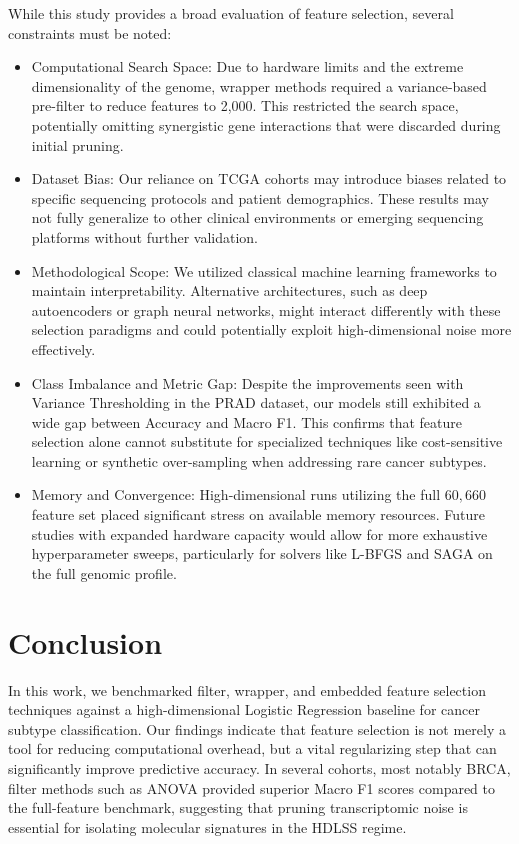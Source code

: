 \documentclass{article}
\begin{document}
While this study provides a broad evaluation of feature selection, several constraints must be noted:

\begin{itemize}
    \item Computational Search Space: Due to hardware limits and the extreme dimensionality of the genome, wrapper methods required a variance-based pre-filter to reduce features to 2,000. This restricted the search space, potentially omitting synergistic gene interactions that were discarded during initial pruning. 
    \item Dataset Bias: Our reliance on TCGA cohorts may introduce biases related to specific sequencing protocols and patient demographics. These results may not fully generalize to other clinical environments or emerging sequencing platforms without further validation.
    \item Methodological Scope: We utilized classical machine learning frameworks to maintain interpretability. Alternative architectures, such as deep autoencoders or graph neural networks, might interact differently with these selection paradigms and could potentially exploit high-dimensional noise more effectively.
    \item Class Imbalance and Metric Gap: Despite the improvements seen with Variance Thresholding in the PRAD dataset, our models still exhibited a wide gap between Accuracy and Macro F1. This confirms that feature selection alone cannot substitute for specialized techniques like cost-sensitive learning or synthetic over-sampling when addressing rare cancer subtypes.
    \item Memory and Convergence: High-dimensional runs utilizing the full $60,660$ feature set placed significant stress on available memory resources. Future studies with expanded hardware capacity would allow for more exhaustive hyperparameter sweeps, particularly for solvers like L-BFGS and SAGA on the full genomic profile.
\end{itemize}







\section{Conclusion}

In this work, we benchmarked filter, wrapper, and embedded feature selection techniques against a high-dimensional Logistic Regression baseline for cancer subtype classification. Our findings indicate that feature selection is not merely a tool for reducing computational overhead, but a vital regularizing step that can significantly improve predictive accuracy. In several cohorts, most notably BRCA, filter methods such as ANOVA provided superior Macro F1 scores compared to the full-feature benchmark, suggesting that pruning transcriptomic noise is essential for isolating molecular signatures in the HDLSS regime.
\end{document}

